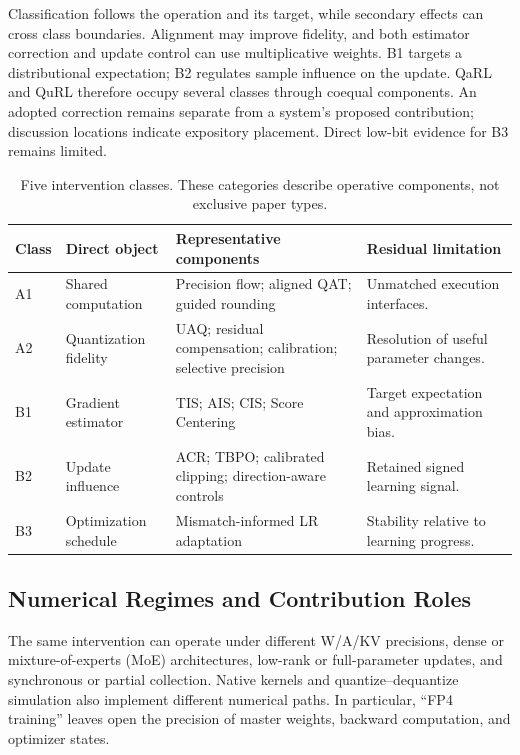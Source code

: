 Classification follows the operation and its target, while secondary effects can cross class boundaries. Alignment may improve fidelity, and both estimator correction and update control can use multiplicative weights. B1 targets a distributional expectation; B2 regulates sample influence on the update. QaRL and QuRL therefore occupy several classes through coequal components. An adopted correction remains separate from a system's proposed contribution; discussion locations indicate expository placement. Direct low-bit evidence for B3 remains limited.


\begin{table}[!htbp]
\centering\small
\caption{Five intervention classes. These categories describe operative components, not exclusive paper types.}\label{tab:taxonomy}
\begin{tabularx}{\linewidth}{@{}P{11mm}P{35mm}YY@{}}\toprule
{} \textbf{Class} & \textbf{Direct object} & \textbf{Representative components} & \textbf{Residual limitation}\\\midrule
A1 & Shared computation & Precision flow; aligned QAT; guided rounding & Unmatched execution interfaces.\\
A2 & Quantization fidelity & UAQ; residual compensation; calibration; selective precision & Resolution of useful parameter changes.\\
B1 & Gradient estimator & TIS; AIS; CIS; Score Centering & Target expectation and approximation bias.\\
B2 & Update influence & ACR; TBPO; calibrated clipping; direction-aware controls & Retained signed learning signal.\\
B3 & Optimization schedule & Mismatch-informed LR adaptation & Stability relative to learning progress.\\\bottomrule
\end{tabularx}
\end{table}


\FloatBarrier
\subsection{Numerical Regimes and Contribution Roles}
The same intervention can operate under different W/A/KV precisions, dense or mixture-of-experts (MoE) architectures, low-rank or full-parameter updates, and synchronous or partial collection. Native kernels and quantize--dequantize simulation also implement different numerical paths. In particular, ``FP4 training'' leaves open the precision of master weights, backward computation, and optimizer states.


